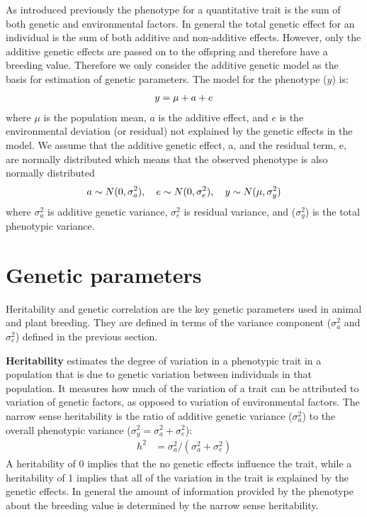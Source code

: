 \documentclass[
]{book}
\begin{document}
As introduced previously the phenotype for a quantitative trait is the sum of both genetic and environmental factors. In general the total genetic effect for an individual is the sum of both additive and non-additive effects. However, only the additive genetic effects are passed on to the offspring and therefore have a breeding value. Therefore we only consider the additive genetic model as the basis for estimation of genetic parameters. The model for the phenotype (\(y\)) is:
\begin{align}
            y=\mu+a+e    \notag
\end{align}
where \(\mu\) is the population mean, \(a\) is the additive effect, and \(e\) is the environmental deviation (or residual) not explained by the genetic effects in the model.
We assume that the additive genetic effect, a, and the residual term, e, are normally distributed which means that the observed phenotype is also normally distributed
\begin{align}
a \sim N(0,\sigma^2_{a}), \quad
e \sim N(0,\sigma^2_{e}), \quad
y \sim N( \mu,\sigma^2_{y}) \notag
\end{align}
where \(\sigma^2_{a}\) is additive genetic variance, \(\sigma^2_{e}\) is residual variance, and (\(\sigma^2_{y}\)) is the total phenotypic variance.

\hypertarget{genetic-parameters}{%
\section{Genetic parameters}\label{genetic-parameters}}

Heritability and genetic correlation are the key genetic parameters used in animal and plant breeding. They are defined in terms of the variance component (\(\sigma^2_{a}\) and \(\sigma^2_{e}\)) defined in the previous section.

\textbf{Heritability} estimates the degree of variation in a phenotypic trait in a population that is due to genetic variation between individuals in that population. It measures how much of the variation of a trait can be attributed to variation of genetic factors, as opposed to variation of environmental factors. The narrow sense heritability is the ratio of additive genetic variance (\(\sigma^2_{a}\)) to the overall phenotypic variance (\(\sigma^2_{y}=\sigma^2_{a}+\sigma^2_{e}\)):
\begin{align}
h^2 &= \sigma^2_{a}/(\sigma^2_a+\sigma^2_e)
\end{align}
A heritability of 0 implies that the no genetic effects influence the trait, while a heritability of 1 implies that all of the variation in the trait is explained by the genetic effects. In general the amount of information provided by the phenotype about the breeding value is determined by the narrow sense heritability.
\end{document}
